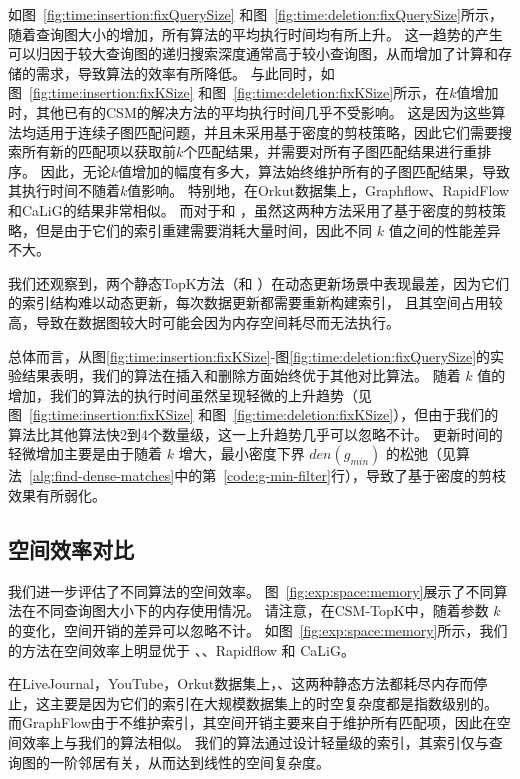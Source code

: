 如图~\ref{fig:time:insertion:fixQuerySize} 和图~\ref{fig:time:deletion:fixQuerySize}所示，随着查询图大小的增加，所有算法的平均执行时间均有所上升。
这一趋势的产生可以归因于较大查询图的递归搜索深度通常高于较小查询图，从而增加了计算和存储的需求，导致算法的效率有所降低。
与此同时，如图~\ref{fig:time:insertion:fixKSize} 和图~\ref{fig:time:deletion:fixKSize}所示，在$k$值增加时，其他已有的CSM的解决方法的平均执行时间几乎不受影响。
这是因为这些算法均适用于连续子图匹配问题，并且未采用基于密度的剪枝策略，因此它们需要搜索所有新的匹配项以获取前$k$个匹配结果，并需要对所有子图匹配结果进行重排序。
因此，无论$k$值增加的幅度有多大，算法始终维护所有的子图匹配结果，导致其执行时间不随着$k$值影响。
特别地，在Orkut数据集上，Graphflow、RapidFlow和CaLiG的结果非常相似。
而对于\itk 和 \pm，虽然这两种方法采用了基于密度的剪枝策略，但是由于它们的索引重建需要消耗大量时间，因此不同 $k$ 值之间的性能差异不大。


我们还观察到，两个静态TopK方法（\itk 和 \pm）在动态更新场景中表现最差，因为它们的索引结构难以动态更新，每次数据更新都需要重新构建索引，
且其空间占用较高，导致在数据图较大时可能会因为内存空间耗尽而无法执行。


总体而言，从图\ref{fig:time:insertion:fixKSize}-图\ref{fig:time:deletion:fixQuerySize}的实验结果表明，我们的算法在插入和删除方面始终优于其他对比算法。
随着 $k$ 值的增加，我们的算法的执行时间虽然呈现轻微的上升趋势（见图~\ref{fig:time:insertion:fixKSize} 和图~\ref{fig:time:deletion:fixKSize}），但由于我们的算法比其他算法快2到4个数量级，这一上升趋势几乎可以忽略不计。
更新时间的轻微增加主要是由于随着 $k$ 增大，最小密度下界 $den(g_{min})$ 的松弛（见算法~\ref{alg:find-dense-matches}中的第~\ref{code:g-min-filter}行），导致了基于密度的剪枝效果有所弱化。


\subsection{空间效率对比}
\label{ch5:space}

我们进一步评估了不同算法的空间效率。
图~\ref{fig:exp:space:memory}展示了不同算法在不同查询图大小下的内存使用情况。
请注意，在CSM-TopK中，随着参数 $k$ 的变化，空间开销的差异可以忽略不计。
如图~\ref{fig:exp:space:memory}所示，我们的方法在空间效率上明显优于 \itk、\pm、Rapidflow 和 CaLiG。

在LiveJournal，YouTube，Orkut数据集上，\itk、\pm 这两种静态方法都耗尽内存而停止，这主要是因为它们的索引在大规模数据集上的时空复杂度都是指数级别的。
而GraphFlow由于不维护索引，其空间开销主要来自于维护所有匹配项，因此在空间效率上与我们的算法相似。
我们的算法通过设计轻量级的索引，其索引仅与查询图的一阶邻居有关，从而达到线性的空间复杂度。



